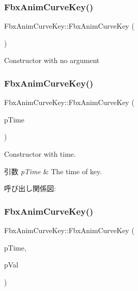 \subsubsection{\texorpdfstring{Fbx\+Anim\+Curve\+Key()}{FbxAnimCurveKey()}\hspace{0.1cm}{\footnotesize\ttfamily [1/4]}}
{\footnotesize\ttfamily Fbx\+Anim\+Curve\+Key\+::\+Fbx\+Anim\+Curve\+Key (\begin{DoxyParamCaption}{ }\end{DoxyParamCaption})}

Constructor with no argument \mbox{\label{class_fbx_anim_curve_key_a5fc23a90c53bc0655161813ee4f6ae00}} 
\subsubsection{\texorpdfstring{Fbx\+Anim\+Curve\+Key()}{FbxAnimCurveKey()}\hspace{0.1cm}{\footnotesize\ttfamily [2/4]}}
{\footnotesize\ttfamily Fbx\+Anim\+Curve\+Key\+::\+Fbx\+Anim\+Curve\+Key (\begin{DoxyParamCaption}\item[{\hyperlink{class_fbx_time}{Fbx\+Time}}]{p\+Time }\end{DoxyParamCaption})}

Constructor with time. 
\begin{DoxyParams}{引数}
{\em p\+Time} & The time of key. \\
\hline
\end{DoxyParams}
呼び出し関係図\+:
\mbox{\label{class_fbx_anim_curve_key_a3e967d8e8d05da27ba82dcebfe2533fc}} 
\subsubsection{\texorpdfstring{Fbx\+Anim\+Curve\+Key()}{FbxAnimCurveKey()}\hspace{0.1cm}{\footnotesize\ttfamily [3/4]}}
{\footnotesize\ttfamily Fbx\+Anim\+Curve\+Key\+::\+Fbx\+Anim\+Curve\+Key (\begin{DoxyParamCaption}\item[{\hyperlink{class_fbx_time}{Fbx\+Time}}]{p\+Time,  }\item[{float}]{p\+Val }\end{DoxyParamCaption})}

